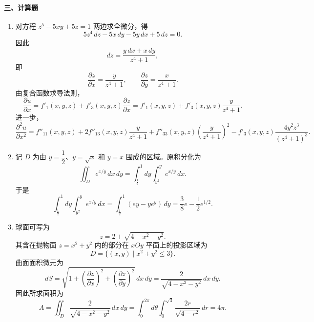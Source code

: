 \paragraph*{三、计算题}
\begin{enumerate}
  \item 对方程 $z^5-5xy+5z=1$ 两边求全微分，得
  \[
    5z^4\,dz-5x\,dy-5y\,dx+5\,dz=0.
  \]
  因此
  \[
    dz=\frac{y\,dx+x\,dy}{z^4+1},
  \]
  即
  \[
    \frac{\partial z}{\partial x}=\frac{y}{z^4+1},
    \qquad
    \frac{\partial z}{\partial y}=\frac{x}{z^4+1}.
  \]
  由复合函数求导法则，
  \[
    \frac{\partial u}{\partial x}
    =f'_1(x,y,z)+f'_3(x,y,z)\frac{\partial z}{\partial x}
    =f'_1(x,y,z)+f'_3(x,y,z)\frac{y}{z^4+1}.
  \]
  进一步，
  \[
    \frac{\partial^2u}{\partial x^2}
    =f''_{11}(x,y,z)+2f''_{13}(x,y,z)\frac{y}{z^4+1}
    +f''_{33}(x,y,z)\left(\frac{y}{z^4+1}\right)^2
    -f'_3(x,y,z)\frac{4y^2z^3}{(z^4+1)^3}.
  \]

  \item 记 $D$ 为由 $y=\dfrac12$、$y=\sqrt{x}$ 和 $y=x$ 围成的区域。原积分化为
  \[
    \iint_D e^{x/y}\,dx\,dy
    =\int_{\frac12}^{1}dy\int_{y^2}^{y}e^{x/y}\,dx.
  \]
  于是
  \[
    \int_{\frac12}^{1}dy\int_{y^2}^{y}e^{x/y}\,dx
    =\int_{\frac12}^{1}\left(ey-ye^y\right)\,dy
    =\frac{3}{8}e-\frac12e^{1/2}.
  \]

  \item 球面可写为
  \[
    z=2+\sqrt{4-x^2-y^2}.
  \]
  其含在抛物面 $z=x^2+y^2$ 内的部分在 $xOy$ 平面上的投影区域为
  \[
    D=\{(x,y)\mid x^2+y^2\le 3\}.
  \]
  曲面面积微元为
  \[
    dS=\sqrt{1+\left(\frac{\partial z}{\partial x}\right)^2
    +\left(\frac{\partial z}{\partial y}\right)^2}\,dx\,dy
    =\frac{2}{\sqrt{4-x^2-y^2}}\,dx\,dy.
  \]
  因此所求面积为
  \[
    A=\iint_D\frac{2}{\sqrt{4-x^2-y^2}}\,dx\,dy
    =\int_0^{2\pi}d\theta\int_0^{\sqrt3}\frac{2r}{\sqrt{4-r^2}}\,dr
    =4\pi.
  \]
\end{enumerate}

